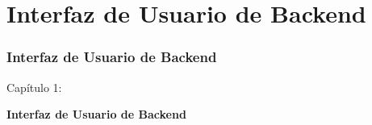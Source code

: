 %

\section{Interfaz de Usuario de Backend}
\begin{frame}[fragile]
	\frametitle{Interfaz de Usuario de Backend}

	\begin{center}\huge{Capítulo 1:}\end{center}
	\begin{center}\huge{\color{typo3darkgrey}\textbf{Interfaz de Usuario de Backend}}\end{center}

\end{frame}

